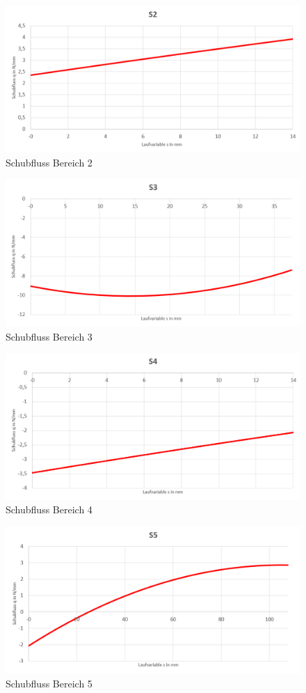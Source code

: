 \begin{figure}
	\includegraphics[width=1.0\textwidth]{Bilder/S2.png}
	\caption{Schubfluss Bereich 2}
\end{figure}
\begin{figure}
	\includegraphics[width=1.0\textwidth]{Bilder/S3.png}
	\caption{Schubfluss Bereich 3}
\end{figure}
\begin{figure}
	\includegraphics[width=1.0\textwidth]{Bilder/S4.png}
	\caption{Schubfluss Bereich 4}
	\label{fig:S4}
\end{figure}
\begin{figure}
	\includegraphics[width=1.0\textwidth]{Bilder/S5.png}
	\caption{Schubfluss Bereich 5}
\end{figure}
